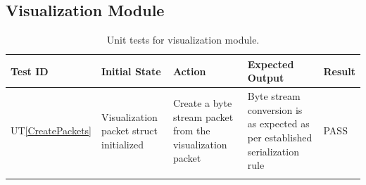 \documentclass[12pt, titlepage]{article}
\newcommand{\utref}[1]{UT\ref{#1}}
\begin{document}
\subsection{Visualization Module}
{\footnotesize
\begin{longtable}{|p{0.8cm}|p{3.5cm}|p{3.5cm}|p{3.5cm}|p{1cm}|}
    \hline
    \textbf{Test ID} & \textbf{Initial State} & \textbf{Action} &
    \textbf{Expected Output} & \textbf{Result} \\ 
    \endfirsthead
    \hline
    
    \utref{CreatePackets} & Visualization packet struct initialized& Create a
    byte stream packet from the visualization packet & Byte stream conversion is
    as expected as per established serialization rule & PASS\\
    \hline

    \caption{Unit tests for visualization module.}
    \label{tab:unit_test_viz}
\end{longtable}
}

\end{document}
